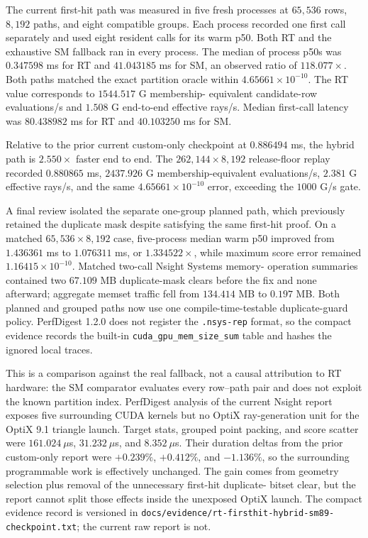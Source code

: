 \documentclass[11pt]{article}
\begin{document}
The current first-hit path was measured in five fresh processes at $65{,}536$
rows, $8{,}192$ paths, and eight compatible groups. Each process recorded one
first call separately and used eight resident calls for its warm p50. Both RT
and the exhaustive SM fallback ran in every process. The median of process p50s
was $0.347598$ ms for RT and $41.043185$ ms for SM, an observed ratio of
$118.077\times$. Both paths matched the exact partition oracle within
$4.65661\times10^{-10}$. The RT value corresponds to $1544.517$ G membership-
equivalent candidate-row evaluations/s and $1.508$ G end-to-end effective
rays/s. Median first-call latency was $80.438982$ ms for RT and $40.103250$ ms
for SM.

Relative to the prior current custom-only checkpoint at $0.886494$ ms, the
hybrid path is $2.550\times$ faster end to end. The $262{,}144\times8{,}192$
release-floor replay recorded $0.880865$ ms, $2437.926$ G membership-equivalent
evaluations/s, $2.381$ G effective rays/s, and the same
$4.65661\times10^{-10}$ error, exceeding the $1000$ G/s gate.

A final review isolated the separate one-group planned path, which previously
retained the duplicate mask despite satisfying the same first-hit proof. On a
matched $65{,}536\times8{,}192$ case, five-process median warm p50 improved from
$1.436361$ ms to $1.076311$ ms, or $1.334522\times$, while maximum score error
remained $1.16415\times10^{-10}$. Matched two-call Nsight Systems memory-
operation summaries contained two $67.109$ MB duplicate-mask clears before the
fix and none afterward; aggregate memset traffic fell from $134.414$ MB to
$0.197$ MB. Both planned and grouped paths now use one compile-time-testable
duplicate-guard policy. PerfDigest 1.2.0 does not register the
\texttt{.nsys-rep} format, so the compact evidence records the built-in
\texttt{cuda\_gpu\_mem\_size\_sum} table and hashes the ignored local traces.

This is a comparison against the real fallback, not a causal attribution to RT
hardware: the SM comparator evaluates every row--path pair and does not exploit
the known partition index. PerfDigest analysis of the current Nsight report
exposes five surrounding CUDA kernels but no OptiX ray-generation unit for the
OptiX 9.1 triangle launch. Target stats, grouped point packing, and score scatter
were $161.024\ \mu$s, $31.232\ \mu$s, and $8.352\ \mu$s. Their duration deltas
from the prior custom-only report were $+0.239\%$, $+0.412\%$, and $-1.136\%$,
so the surrounding programmable work is effectively unchanged. The gain comes
from geometry selection plus removal of the unnecessary first-hit duplicate-
bitset clear, but the report cannot split those effects inside the unexposed
OptiX launch. The compact evidence record is versioned in
\texttt{docs/evidence/rt-firsthit-hybrid-sm89-checkpoint.txt}; the current raw
report is not.
\end{document}
